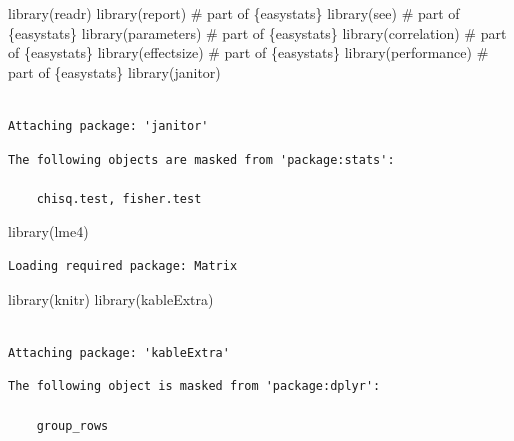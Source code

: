 \documentclass[
  letterpaper,
  DIV=11,
  numbers=noendperiod]{scrreprt}
\newenvironment{Shaded}{\begin{snugshade}}{\end{snugshade}}
\newcommand{\CommentTok}[1]{\textcolor[rgb]{0.37,0.37,0.37}{#1}}
\newcommand{\FunctionTok}[1]{\textcolor[rgb]{0.28,0.35,0.67}{#1}}
\newcommand{\NormalTok}[1]{\textcolor[rgb]{0.00,0.23,0.31}{#1}}
\begin{document}
\begin{Shaded}
\begin{Highlighting}[]
\FunctionTok{library}\NormalTok{(readr)}
\FunctionTok{library}\NormalTok{(report) }\CommentTok{\# part of \{easystats\}}
\FunctionTok{library}\NormalTok{(see) }\CommentTok{\# part of \{easystats\}}
\FunctionTok{library}\NormalTok{(parameters) }\CommentTok{\# part of \{easystats\}}
\FunctionTok{library}\NormalTok{(correlation) }\CommentTok{\# part of \{easystats\}}
\FunctionTok{library}\NormalTok{(effectsize) }\CommentTok{\# part of \{easystats\}}
\FunctionTok{library}\NormalTok{(performance) }\CommentTok{\# part of \{easystats\}}
\FunctionTok{library}\NormalTok{(janitor)}
\end{Highlighting}
\end{Shaded}

\begin{verbatim}

Attaching package: 'janitor'
\end{verbatim}

\begin{verbatim}
The following objects are masked from 'package:stats':

    chisq.test, fisher.test
\end{verbatim}

\begin{Shaded}
\begin{Highlighting}[]
\FunctionTok{library}\NormalTok{(lme4)}
\end{Highlighting}
\end{Shaded}

\begin{verbatim}
Loading required package: Matrix
\end{verbatim}

\begin{Shaded}
\begin{Highlighting}[]
\FunctionTok{library}\NormalTok{(knitr)}
\FunctionTok{library}\NormalTok{(kableExtra)}
\end{Highlighting}
\end{Shaded}

\begin{verbatim}

Attaching package: 'kableExtra'
\end{verbatim}

\begin{verbatim}
The following object is masked from 'package:dplyr':

    group_rows
\end{verbatim}
\end{document}

